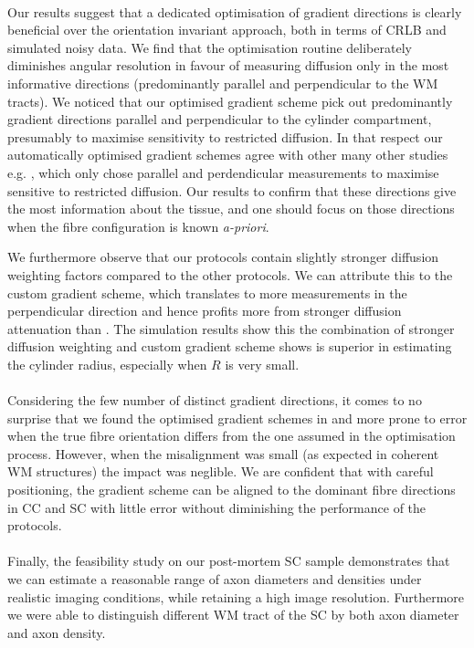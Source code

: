 \paragraph{}
Our results suggest that a dedicated optimisation of gradient directions is clearly beneficial over the orientation invariant \OI approach, both in terms of CRLB and simulated noisy data. We find that the optimisation routine deliberately diminishes angular resolution in favour of measuring diffusion only in the most informative directions (predominantly parallel and perpendicular to the WM tracts). We noticed that our optimised gradient scheme pick out predominantly gradient directions parallel and perpendicular to the cylinder compartment, presumably to maximise sensitivity to restricted diffusion. In that respect our automatically optimised gradient schemes agree with other many other studies e.g. \citep{Stanisz:1997,Avram:2008,Assaf:2008,Panagiotaki:2012}, which only chose parallel and perdendicular measurements to maximise sensitive to restricted diffusion. Our results to confirm that these directions give the most information about the tissue, and one should focus on those directions when the fibre configuration is known \textit{a-priori}. 


We furthermore observe that our {\FD} protocols contain slightly stronger diffusion weighting factors compared to the other protocols. We can attribute this to the custom gradient scheme, which translates to more measurements in the perpendicular direction and hence profits more from stronger diffusion attenuation than {\OI}. The simulation results show this the combination of stronger diffusion weighting and custom gradient scheme shows is superior in estimating the cylinder radius, especially when $R$ is very small.

\paragraph{}
Considering the few number of distinct gradient directions, it comes to no surprise that we found the optimised gradient schemes in {\FD} and {\DO} more prone to error when the true fibre orientation differs from the one assumed in the optimisation process. However, when the misalignment was small (as expected in coherent WM structures) the impact was neglible. We are confident that with careful positioning, the {\SF} gradient scheme can be aligned to the dominant fibre directions in CC and SC with little error without diminishing the performance of the {\SF} protocols.
\paragraph{}
Finally, the feasibility study on our post-mortem SC sample demonstrates that we can estimate a reasonable range of axon diameters and densities under realistic imaging conditions, while retaining a high image resolution. Furthermore we were able to distinguish different WM tract of the SC by both axon diameter and axon density.

